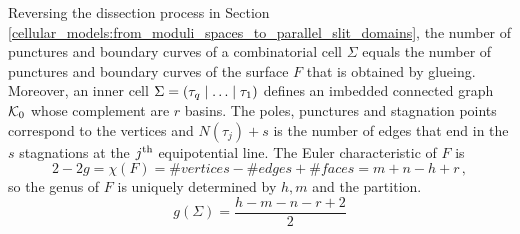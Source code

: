 \begin{rem}
    \label{cellular_models:parallel:h_m_n_g_are_recognized}
    Reversing the dissection process in Section \ref{cellular_models:from_moduli_spaces_to_parallel_slit_domains},
    the number of punctures and boundary curves of a combinatorial cell $\Sigma$
    equals the number of punctures and boundary curves of the surface $F$ that is obtained by glueing.
    Moreover, an inner cell $\Sigma = \inhomq$ defines an imbedded connected graph $\mathcal{K}_0$ whose complement are $r$ basins.
    The poles, punctures and stagnation points correspond to the vertices and $N(\tau_j)+s$ is the number of edges that end in the $s$ stagnations at the $j^{\text{th}}$ equipotential line.
    The Euler characteristic of $F$ is
    \[
        2-2g = \chi(F) = \#vertices - \#edges + \#faces = m+n - h + r\,,
    \]
    so the genus of $F$ is uniquely determined by $h,m$ and the partition.
    \[
        g(\Sigma) = \frac{h - m - n - r + 2}{2}
    \]

\end{rem}
